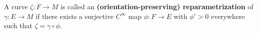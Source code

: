 A curve $\zeta: F \rightarrow M$ is called an \textbf{(orientation-preserving) reparametrization} of $\gamma: E \rightarrow M$ if there exists a surjective $C^\infty$ map $\phi: F \rightarrow E$ with $\phi' > 0$ everywhere such that $\zeta = \gamma \circ \phi$.
